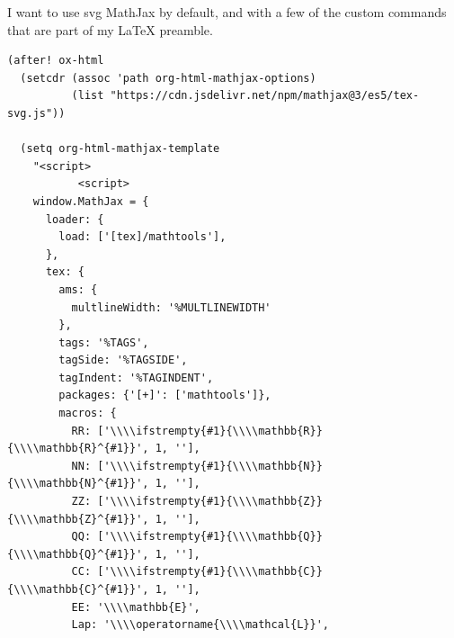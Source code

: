 \documentclass[11pt]{article}
\begin{document}
I want to use svg MathJax by default, and with a few of the custom commands that
are part of my \LaTeX{} preamble.

\begin{verbatim}
(after! ox-html
  (setcdr (assoc 'path org-html-mathjax-options)
          (list "https://cdn.jsdelivr.net/npm/mathjax@3/es5/tex-svg.js"))

  (setq org-html-mathjax-template
    "<script>
           <script>
    window.MathJax = {
      loader: {
        load: ['[tex]/mathtools'],
      },
      tex: {
        ams: {
          multlineWidth: '%MULTLINEWIDTH'
        },
        tags: '%TAGS',
        tagSide: '%TAGSIDE',
        tagIndent: '%TAGINDENT',
        packages: {'[+]': ['mathtools']},
        macros: {
          RR: ['\\\\ifstrempty{#1}{\\\\mathbb{R}}{\\\\mathbb{R}^{#1}}', 1, ''],
          NN: ['\\\\ifstrempty{#1}{\\\\mathbb{N}}{\\\\mathbb{N}^{#1}}', 1, ''],
          ZZ: ['\\\\ifstrempty{#1}{\\\\mathbb{Z}}{\\\\mathbb{Z}^{#1}}', 1, ''],
          QQ: ['\\\\ifstrempty{#1}{\\\\mathbb{Q}}{\\\\mathbb{Q}^{#1}}', 1, ''],
          CC: ['\\\\ifstrempty{#1}{\\\\mathbb{C}}{\\\\mathbb{C}^{#1}}', 1, ''],
          EE: '\\\\mathbb{E}',
          Lap: '\\\\operatorname{\\\\mathcal{L}}',

\end{verbatim}
\end{document}
